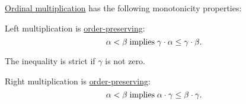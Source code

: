 \begin{proposition}\label{thm:ordinal_multiplication_is_monotone}
  \hyperref[def:ordinal_arithmetic/multiplication]{Ordinal multiplication} has the following monotonicity properties:
  \begin{thmenum}
     Left multiplication is \hyperref[eq:def:order_function/preserving]{order-preserving}:
    \begin{equation}\label{eq:thm:ordinal_multiplication_is_monotone/left}
      \alpha < \beta \T{implies} \gamma \cdot \alpha \leq \gamma \cdot \beta.
    \end{equation}

    The inequality is strict if \( \gamma \) is not zero.

     Right multiplication is \hyperref[def:order_function/preserving]{order-preserving}:
    \begin{equation}\label{eq:thm:ordinal_multiplication_is_monotone/right}
      \alpha < \beta \T{implies} \alpha \cdot \gamma \leq \beta \cdot \gamma.
    \end{equation}
  \end{thmenum}
\end{proposition}
